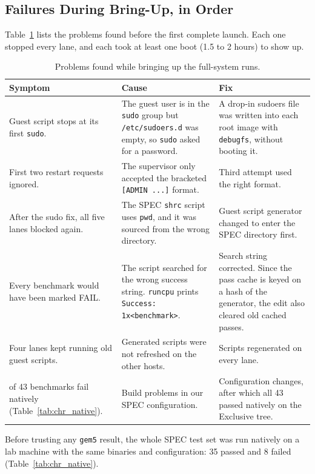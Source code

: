 \subsection{Failures During Bring-Up, in Order}
Table~\ref{tab:chr_bringup} lists the problems found before the first complete launch. Each one stopped every lane, and each took at least one boot (1.5 to 2 hours) to show up.

\begin{table}[H]
\centering
\small
\caption{Problems found while bringing up the full-system runs.}
\label{tab:chr_bringup}
\begin{tabularx}{\textwidth}{>{\raggedright\arraybackslash}p{3.3cm} X X}
\toprule
\textbf{Symptom} & \textbf{Cause} & \textbf{Fix} \\
\midrule
Guest script stops at its first \texttt{sudo}. & The guest user is in the \texttt{sudo} group but \texttt{/etc/sudoers.d} was empty, so \texttt{sudo} asked for a password. & A drop-in sudoers file was written into each root image with \texttt{debugfs}, without booting it. \\
First two restart requests ignored. & The supervisor only accepted the bracketed \texttt{[ADMIN ...]} format. & Third attempt used the right format. \\
After the sudo fix, all five lanes blocked again. & The SPEC \texttt{shrc} script uses \texttt{pwd}, and it was sourced from the wrong directory. & Guest script generator changed to enter the SPEC directory first. \\
Every benchmark would have been marked FAIL. & The script searched for the wrong success string. \texttt{runcpu} prints \texttt{Success: 1x<benchmark>}. & Search string corrected. Since the pass cache is keyed on a hash of the generator, the edit also cleared old cached passes. \\
Four lanes kept running old guest scripts. & Generated scripts were not refreshed on the other hosts. & Scripts regenerated on every lane. \\
8 of 43 benchmarks fail natively (Table~\ref{tab:chr_native}). & Build problems in our SPEC configuration. & Configuration changes, after which all 43 passed natively on the Exclusive tree. \\
\bottomrule
\end{tabularx}
\end{table}

Before trusting any \texttt{gem5} result, the whole SPEC test set was run natively on a lab machine with the same binaries and configuration: 35 passed and 8 failed (Table~\ref{tab:chr_native}).

